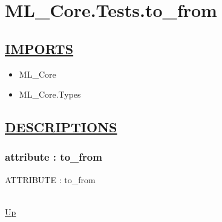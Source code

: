 \chapter*{ML\_Core.Tests.to\_from}
\hypertarget{ML_Core.Tests.to_from}{}

\section*{\underline{IMPORTS}}
\begin{itemize}
\item ML\_Core
\item ML\_Core.Types
\end{itemize}

\section*{\underline{DESCRIPTIONS}}
\subsection*{attribute : to\_from}
\hypertarget{ecldoc:ml_core.tests.to_from}{ATTRIBUTE : to\_from} \\
\hyperlink{ecldoc:}{Up} \\
\par
